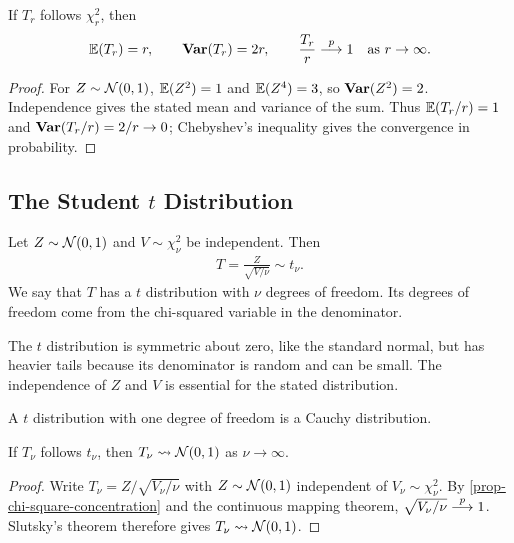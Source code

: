 \documentclass[a4paper,12pt]{article}
\begin{document}
\begin{proposition}\label{prop-chi-square-concentration}
	If $T_r$ follows $\chi_r^2$, then
	\begin{align}
		\operatorname{\mathbb{E}}(T_r)=r,\qquad \operatorname{\text{\textrm{\upshape\textbf{Var}}}}(T_r)=2r,
		\qquad \frac{T_r}{r}\overset{p}{\longrightarrow} 1\quad\text{as }r\to\infty.
	\end{align}
\end{proposition}
\begin{proof}
	For $Z\sim\operatorname{\mathcal{N}}(0,1)$, $\operatorname{\mathbb{E}}(Z^2)=1$ and $\operatorname{\mathbb{E}}(Z^4)=3$,
	so $\operatorname{\text{\textrm{\upshape\textbf{Var}}}}(Z^2)=2$.
	Independence gives the stated mean and variance of the sum.
	Thus $\operatorname{\mathbb{E}}(T_r/r)=1$ and $\operatorname{\text{\textrm{\upshape\textbf{Var}}}}(T_r/r)=2/r\to0$;
	Chebyshev's inequality gives the convergence in probability.
\end{proof}

\subsection{The Student \texorpdfstring{$t$}{t} Distribution}

\begin{definition}
	Let $Z\sim\operatorname{\mathcal{N}}(0,1)$ and $V\sim\chi_\nu^2$ be independent.
	Then
	\begin{align}
		T=\frac{Z}{\sqrt{V/\nu}}\sim t_\nu.
	\end{align}
	We say that $T$ has a $t$ distribution with $\nu$ degrees of freedom.
	Its degrees of freedom come from the chi-squared variable in the denominator.
\end{definition}

\begin{remark}
	The $t$ distribution is symmetric about zero, like the standard normal,
	but has heavier tails because its denominator is random and can be small.
	The independence of $Z$ and $V$ is essential for the stated distribution.
\end{remark}

\begin{remark}
	A $t$ distribution with one degree of freedom is a Cauchy distribution.
\end{remark}

\begin{proposition}
	If $T_\nu$ follows $t_\nu$, then $T_\nu\overset{}{\leadsto}\operatorname{\mathcal{N}}(0,1)$ as $\nu\to\infty$.
\end{proposition}
\begin{proof}
	Write $T_\nu=Z/\sqrt{V_\nu/\nu}$ with $Z\sim\operatorname{\mathcal{N}}(0,1)$
	independent of $V_\nu\sim\chi_\nu^2$.
	By \autoref{prop-chi-square-concentration} and the continuous mapping theorem,
	$\sqrt{V_\nu/\nu}\overset{p}{\longrightarrow}1$.
	Slutsky's theorem therefore gives $T_\nu\overset{}{\leadsto}\operatorname{\mathcal{N}}(0,1)$.
\end{proof}
\end{document}

